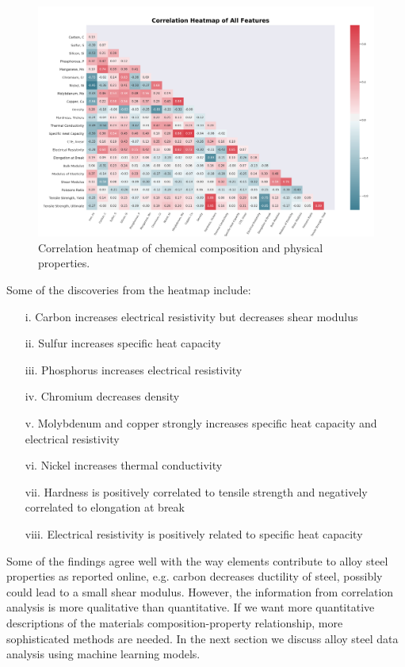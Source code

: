 \documentclass[10pt,aps,prb,amsmath,amssymb,twocolumn,letterpaper,nobalancelastpage,final,citeautoscript,floatfix,raggedbottom,superscriptaddress]{revtex4-1}
\begin{document}
\begin{figure}[t]
  \center
 \includegraphics[width=0.85\linewidth]{figures/heatmap_mask.png}
  \caption{Correlation heatmap of chemical composition and physical properties.}
  \label{fig:heatmap}
\end{figure}

Some of the discoveries from the heatmap include:
\begin{enumerate}
	\item[i.] Carbon increases electrical resistivity but decreases shear modulus
	\item[ii.] Sulfur increases specific heat capacity
	\item[iii.] Phosphorus increases electrical resistivity
	\item[iv.] Chromium decreases density
	\item[v.] Molybdenum and copper strongly increases specific heat capacity and electrical resistivity
	\item[vi.] Nickel increases thermal conductivity
	\item[vii.] Hardness is positively correlated to tensile strength and negatively correlated to elongation at break
	\item[viii.] Electrical resistivity is positively related to specific heat capacity
\end{enumerate}


Some of the findings agree well with the way elements contribute to alloy steel properties as reported online, e.g. carbon decreases ductility of steel, possibly could lead to a small shear modulus. However, the information from correlation analysis is more qualitative than quantitative. If we want more quantitative descriptions of the materials composition-property relationship, more sophisticated methods are needed. In the next section we discuss alloy steel data analysis using machine learning models.
\end{document}
